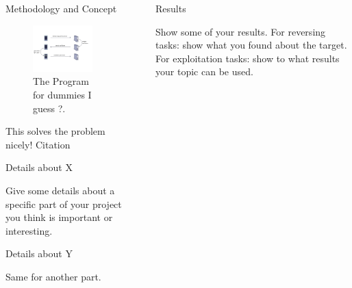 \documentclass[final,dvipsnames]{beamer}
\newlength{\sepwidth}
\newlength{\colwidth}
\newcommand{\separatorcolumn}{\begin{column}{\sepwidth}\end{column}}
\begin{document}
\begin{frame}[t, fragile]
\begin{columns}[t]
\begin{column}{\colwidth}
\begin{alertblock}{Methodology and Concept}
		\begin{figure}[h] %
			\centering
			\includegraphics[width=0.9\textwidth]{Image_1.png} %
			\caption{The Program for dummies I guess ?.}
			\label{fig:sample}
		\end{figure}

		This solves the problem nicely! Citation\cite{goli_resprop_2020}

	\end{alertblock}

	\begin{block}{Details about X}

		Give some details about a specific part of your project you think is
		important or interesting.

	\end{block}

	\begin{block}{Details about Y}

		Same for another part.

	\end{block}

\end{column}

\separatorcolumn

\begin{column}{\colwidth}

	\begin{block}{Results}

		Show some of your results. For reversing tasks: show what you found about
		the target. For exploitation tasks: show to what results your topic can be
		used.


\end{block}
\end{column}
\end{columns}
\end{frame}
\end{document}
